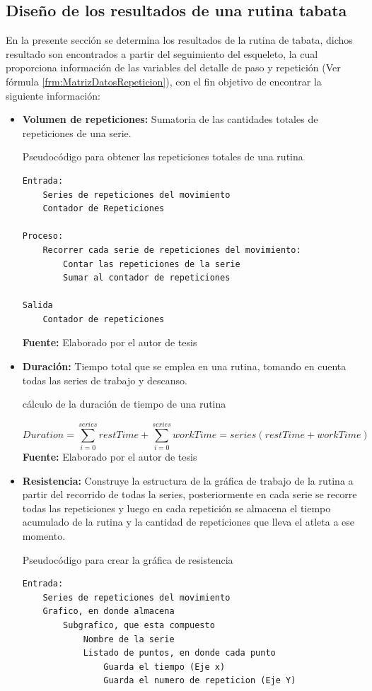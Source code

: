 \subsection{Dise\~no de los resultados de una rutina tabata} \label{dis:results}
En la presente secci\'on se determina los resultados de la rutina de tabata, dichos resultado son encontrados a partir del seguimiento del esqueleto, la cual proporciona informaci\'on de las variables del detalle de paso y repetici\'on (Ver f\'ormula \ref{frm:MatrizDatosRepeticion}), con el fin objetivo de encontrar la siguiente informaci\'on:
\begin{itemize}
\item \textbf{Volumen de repeticiones:} Sumatoria de las cantidades totales de repeticiones de una serie.  
\begin{code}[H]
	\caption{Pseudoc\'odigo para obtener las repeticiones totales de una rutina}
	\label{code:getRepetitions}
	\begin{lstlisting}
Entrada:
	Series de repeticiones del movimiento
	Contador de Repeticiones

Proceso:
	Recorrer cada serie de repeticiones del movimiento:
		Contar las repeticiones de la serie
		Sumar al contador de repeticiones

Salida
	Contador de repeticiones
	\end{lstlisting}
	\textbf{Fuente:} Elaborado por el autor de tesis
\end{code}

\item \textbf{Duraci\'on:} Tiempo total que se emplea en una rutina, tomando en cuenta todas las series de trabajo y descanso.
\begin{formula}[H]
	\centering
	\caption{c\'alculo de la duraci\'on de tiempo de una rutina}
	\label{eq:DurationTime}
	\begin{equation}
	Duration = \sum_{i=0}^{series}restTime +\sum_{i=0}^{series}workTime = series(restTime+workTime)
	\end{equation}
		\textbf{Fuente:} Elaborado por el autor de tesis
\end{formula}
\item \textbf{Resistencia:} Construye la estructura de la gr\'afica de trabajo de la rutina a partir del recorrido de todas la series, posteriormente en cada serie se recorre todas las repeticiones y luego en cada repetici\'on se almacena el tiempo acumulado de la rutina y la cantidad de repeticiones que lleva el atleta a ese momento.
\begin{code}[H]
	\caption{Pseudoc\'odigo para crear la gr\'afica de resistencia}
	\label{code:getEndurance}
	\begin{lstlisting}
Entrada:
	Series de repeticiones del movimiento
	Grafico, en donde almacena
		Subgrafico, que esta compuesto
			Nombre de la serie
			Listado de puntos, en donde cada punto
				Guarda el tiempo (Eje x)
				Guarda el numero de repeticion (Eje Y)
	

\end{lstlisting}
\end{code}
\end{itemize}
